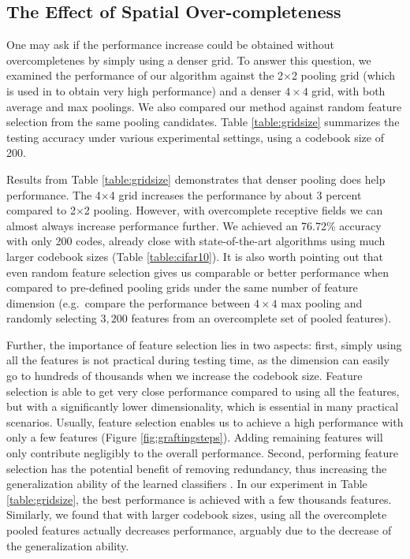 \subsection{The Effect of Spatial Over-completeness}

One may ask if the performance increase could be obtained without overcompletenes by simply using a denser grid. To answer this question, we examined the performance of our algorithm against the 2$\times$2 pooling grid (which is used in \cite{coates2011icml} to obtain very high performance) and a denser $4\times4$ grid, with both average and max poolings. We also compared our method against random feature selection from the same pooling candidates. Table \ref{table:gridsize} summarizes the testing accuracy under various experimental settings, using a codebook size of 200.

Results from Table \ref{table:gridsize} demonstrates that denser pooling does help performance. The 4$\times$4 grid increases the performance by about 3 percent compared to 2$\times$2 pooling. However, with overcomplete receptive fields we can almost always increase performance further. We achieved an 76.72\% accuracy with only 200 codes, already close with state-of-the-art algorithms using much larger codebook sizes (Table \ref{table:cifar10}). It is also worth pointing out that even random feature selection gives us comparable or better performance when compared to pre-defined pooling grids under the same number of feature dimension (e.g.\ compare the performance between $4\times4$ max pooling and randomly selecting $3,200$ features from an overcomplete set of pooled features). 

Further, the importance of feature selection lies in two aspects: first, simply using all the features is not practical during testing time, as the dimension can easily go to hundreds of thousands when we increase the codebook size. Feature selection is able to get very close performance compared to using all the features, but with a significantly lower dimensionality, which is essential in many practical scenarios. Usually, feature selection enables us to achieve a high performance with only a few features (Figure \ref{fig:graftingsteps}). Adding remaining features will only contribute negligibly to the overall performance. Second, performing feature selection has the potential benefit of removing redundancy, thus increasing the generalization ability of the learned classifiers \cite{Perkins:2003vc,tibshirani1996regression}. In our experiment in Table \ref{table:gridsize}, the best performance is achieved with a few thousands features. Similarly, we found that with larger codebook sizes, using all the overcomplete pooled features actually decreases performance, arguably due to the decrease of the generalization ability. 

